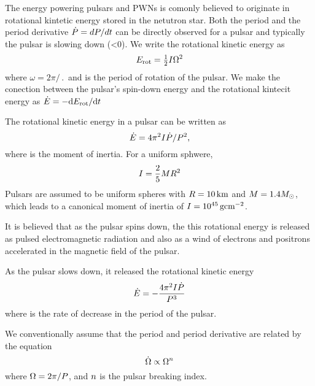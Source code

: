 
The energy powering pulsars and \acp{PWN} is comonly
believed to originate in rotational kintetic energy stored in
the netutron star. 
Both the period \period and the period derivative
$\dot{P}=dP/dt$ can be directly observed for a pulsar
and typically the pulsar is slowing down (\perioddot<0).
We write the rotational kinetic energy as
\begin{equation}
  E_\text{rot} = \tfrac{1}{2} I \Omega^2
\end{equation}
where $\omega = 2\pi/\period$ and \period is the period of
rotation of the pulsar. We make the conection between
the pulsar's spin-down energy and the rotational kintecit energy as
$\dot{E} = - \text{d}E_\text{rot}/\text{d}t$

The rotational kinetic energy in a pulsar can be written as
\begin{equation}
  \dot{E} = 4\pi^2 I \dot{P}/P^2,
\end{equation}
where \momentofinertia is the moment of inertia.
For a uniform sphwere,
\begin{equation}
  I = \frac{2}{5} M R^2
\end{equation}
Pulsars are assumed to be uniform spheres with $R=10\,\text{km}$
and $M=1.4M_{\odot}$, which leads to a canonical moment of inertia of
$I=10^{45}\,\text{g}\text{cm}^{-2}$.

It is believed that as the pulsar spins down, the this rotational energy
is released as pulsed electromagnetic radiation and also as a wind of
electrons and positrons accelerated in the magnetic field of the pulsar.

As the pulsar slows down, it released the rotational kinetic energy
\begin{equation}
  \dot{E} = - \frac{4 \pi^2 I \dot{P}}{P^3}
\end{equation}
where \perioddot is the rate of decrease in the period of the pulsar.


We conventionally assume that the period and period derivative are related
by the equation
\begin{equation}\eqnlabel{angular_frequency_derivative_relation}
  \angularfrequencydot \propto \angularfrequency^\breakingindex
\end{equation}
where $\Omega=2\pi/P$, and $n$
is the pulsar breaking index. 

